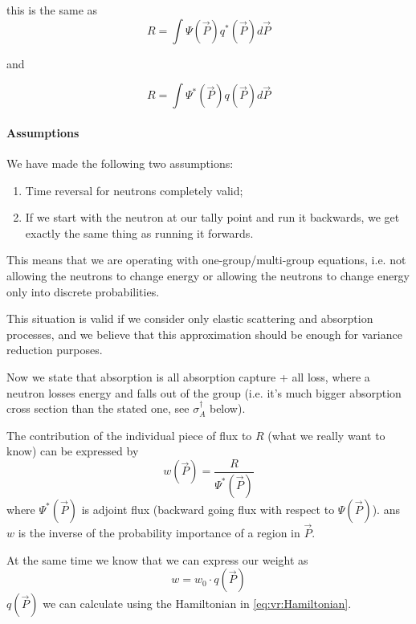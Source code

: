 this is the same as
\begin{equation*}
  R = \int \Psi(\vec{P}) q^*(\vec{P}) d\vec{P}
\end{equation*}

and

\begin{equation*}
  R = \int \Psi^*(\vec{P}) q(\vec{P}) d\vec{P}
\end{equation*}

\paragraph{Assumptions}
We have made the following two assumptions:
\begin{enumerate}
\item Time reversal for neutrons completely valid;
\item If we start with the neutron at our tally point and run it backwards, we get exactly the same thing as running it forwards.
\end{enumerate}
This means that we are operating with one-group/multi-group equations,
i.e. not allowing the neutrons to change energy or allowing the neutrons to change energy only into discrete
probabilities.

This situation is valid if we consider only elastic scattering and absorption processes, and we believe that
this approximation should be enough for variance reduction purposes.

\bigskip


Now we state that absorption is all absorption capture + all loss, where a neutron losses energy and falls out of the group
(i.e. it's much bigger absorption cross section than the stated one, see $\sigma_{A}^\dagger$ below).

The contribution of the individual piece of flux to $R$ (what we really want to know) can be expressed by
\begin{equation}
  \label{eq:vr:w}
  w(\vec{P}) = \frac{R}{\Psi^*(\vec{P})}
\end{equation}
where $\Psi^*(\vec{P})$ is adjoint flux (backward going flux with respect to $\Psi(\vec{P})$).
ans $w$ is the inverse of the probability importance of a region in $\vec{P}$.

At the same time we know that we can express our weight as
\begin{equation}
  \label{eq:vr:w0}
  w = w_0 \cdot q(\vec{P})
\end{equation}
$q(\vec{P})$ we can calculate using the Hamiltonian in \eqref{eq:vr:Hamiltonian}.

